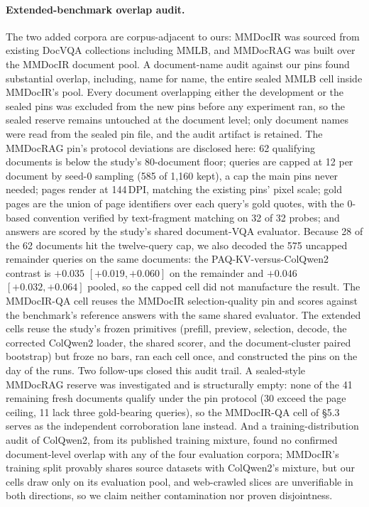 \documentclass[letterpaper]{article} %
\newcommand{\paqc}{\textsc{PAQ-KV}}
\begin{document}
\paragraph{Extended-benchmark overlap audit.} The two added corpora are
corpus-adjacent to ours: MMDocIR was sourced from existing DocVQA collections
including MMLB, and MMDocRAG was built over the MMDocIR document
pool. A document-name audit against our pins found substantial overlap,
including, name for name, the entire sealed MMLB cell inside
MMDocIR's pool. Every document overlapping either the development or the
sealed pins was excluded from the new pins before any experiment ran, so the
sealed reserve remains untouched at the document level; only document names
were read from the sealed pin file, and the audit artifact is retained. The
MMDocRAG pin's protocol deviations are disclosed here: 62 qualifying
documents is below the study's 80-document floor; queries are capped at 12
per document by seed-0 sampling (585 of 1{,}160 kept), a cap the main pins
never needed; pages render at 144\,DPI, matching the existing pins' pixel
scale; gold pages are the union of page identifiers over each query's gold
quotes, with the 0-based convention verified by text-fragment matching on 32
of 32 probes; and answers are scored by the study's shared document-VQA
evaluator. Because 28 of the 62 documents hit the twelve-query cap, we also
decoded the 575 uncapped remainder queries on the same documents: the
\paqc{}-versus-ColQwen2 contrast is $+0.035$ $[+0.019,+0.060]$ on the
remainder and $+0.046$ $[+0.032,+0.064]$ pooled, so the capped cell did not
manufacture the result. The MMDocIR-QA cell reuses the MMDocIR
selection-quality pin and scores against the benchmark's reference answers
with the same shared evaluator. The extended cells reuse the study's frozen
primitives (prefill, preview, selection, decode, the corrected ColQwen2
loader, the shared scorer, and the document-cluster paired bootstrap) but
froze no bars, ran each cell once, and constructed the pins on the day of
the runs. Two follow-ups closed this audit trail. A sealed-style MMDocRAG
reserve was investigated and is structurally empty: none of the 41 remaining
fresh documents qualify under the pin protocol (30 exceed the page ceiling,
11 lack three gold-bearing queries), so the MMDocIR-QA cell of
\S5.3 serves as the independent corroboration lane
instead. And a training-distribution audit of ColQwen2, from its published
training mixture, found no confirmed document-level overlap with any of the
four evaluation corpora; MMDocIR's training split provably shares source
datasets with ColQwen2's mixture, but our cells draw only on its evaluation
pool, and web-crawled slices are unverifiable in both directions, so we
claim neither contamination nor proven disjointness.
\end{document}
